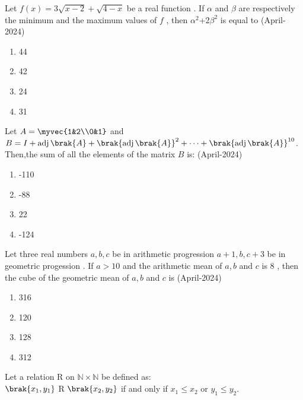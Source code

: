 \iffalse
  \tilte{Assignment}
  \author{EE24BTECH11041}
  \section{mcq-single}
\fi  
\item Let $f(x)=3\sqrt{x-2}+\sqrt{4-x}$ be a real function . If $\alpha$ and $\beta$ are respectively the minimum and the maximum values of $f$ , then $\alpha^2$+2$\beta^2$ is equal to
\hfill{(April-2024)}
\begin{multicols}{2}
\begin{enumerate}
\item 44
\item 42 
\item 24
\item 31
\end{enumerate}
\end{multicols}
\item Let $A=\myvec{1&2\\0&1}$ and $B=I+\operatorname{adj}\brak{A}+\brak{\operatorname{adj}\brak{A}}^2+\dots+\brak{\operatorname{adj}\brak{A}}^{10}$.\\
Then,the sum of all the elements of the matrix $B$ is:
\hfill{(April-2024)}
\begin{multicols}{2}
\begin{enumerate}
\item -110
\item -88 
\item 22
\item -124
\end{enumerate}
\end{multicols}
\item Let three real numbers $a,b,c$ be in arithmetic progression $a+1,b,c+3$ be in geometric progession . If $a>10$ and the arithmetic mean of $a,b$ and $c$ is 8 , then the cube of the geometric mean of $a,b$ and $c$ is
\hfill{(April-2024)}
\begin{multicols}{2}
\begin{enumerate}
\item 316
\item 120
\item 128
\item 312
\end{enumerate}
\end{multicols}
\item Let a relation R on $\mathbb{N} \times \mathbb{N}$ be defined as:\\
$\brak{x_1,y_1}$ R $\brak{x_2,y_2}$ if and only if $x_1\leq x_2$ or $y_1\leq y_2$.\\
